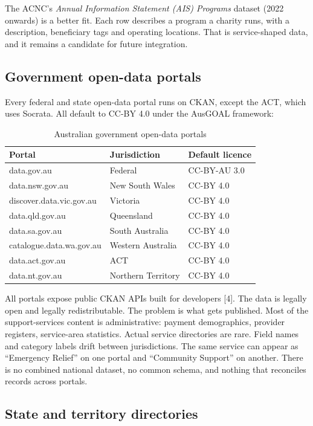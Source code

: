 \documentclass[11pt,a4paper]{article}
\newcommand{\theadstyle}{\cellcolor{headerbg}\textbf}
\begin{document}
The ACNC's \textit{Annual Information Statement (AIS) Programs} dataset (2022 onwards) is a better fit. Each row describes a program a charity runs, with a description, beneficiary tags and operating locations. That is service-shaped data, and it remains a candidate for future integration.

\subsection{Government open-data portals}

Every federal and state open-data portal runs on CKAN, except the ACT, which uses Socrata. All default to CC-BY 4.0 under the AusGOAL framework:

\begin{table}[ht!]
\centering
\begin{tabular}{@{}lll@{}}
\toprule
\rowcolor{headerbg} \theadstyle{Portal} & \theadstyle{Jurisdiction} & \theadstyle{Default licence} \\
\midrule
data.gov.au & Federal & CC-BY-AU 3.0 \\
data.nsw.gov.au & New South Wales & CC-BY 4.0 \\
discover.data.vic.gov.au & Victoria & CC-BY 4.0 \\
data.qld.gov.au & Queensland & CC-BY 4.0 \\
data.sa.gov.au & South Australia & CC-BY 4.0 \\
catalogue.data.wa.gov.au & Western Australia & CC-BY 4.0 \\
data.act.gov.au & ACT & CC-BY 4.0 \\
data.nt.gov.au & Northern Territory & CC-BY 4.0 \\
\bottomrule
\end{tabular}
\caption{Australian government open-data portals}
\end{table}

All portals expose public CKAN APIs built for developers [4]. The data is legally open and legally redistributable. The problem is what gets published. Most of the support-services content is administrative: payment demographics, provider registers, service-area statistics. Actual service directories are rare. Field names and category labels drift between jurisdictions. The same service can appear as ``Emergency Relief'' on one portal and ``Community Support'' on another. There is no combined national dataset, no common schema, and nothing that reconciles records across portals.

\subsection{State and territory directories}
\end{document}
